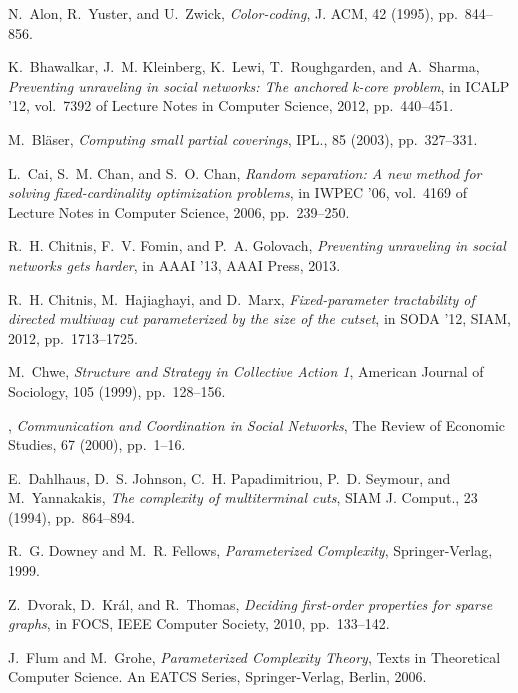 \documentclass[11pt,a4paper]{article}
\begin{document}
\begin{thebibliography}{10}

{\sc N.~Alon, R.~Yuster, and U.~Zwick}, {\em Color-coding}, J. ACM, 42 (1995),
  pp.~844--856.

{\sc K.~Bhawalkar, J.~M. Kleinberg, K.~Lewi, T.~Roughgarden, and A.~Sharma},
  {\em Preventing unraveling in social networks: The anchored k-core problem},
  in ICALP '12, vol.~7392 of Lecture Notes in Computer Science, 2012,
  pp.~440--451.

{\sc M.~Bl{\"a}ser}, {\em Computing small partial coverings}, IPL., 85 (2003),
  pp.~327--331.

{\sc L.~Cai, S.~M. Chan, and S.~O. Chan}, {\em Random separation: A new method
  for solving fixed-cardinality optimization problems}, in IWPEC '06, vol.~4169
  of Lecture Notes in Computer Science, 2006, pp.~239--250.

{\sc R.~H. Chitnis, F.~V. Fomin, and P.~A. Golovach}, {\em Preventing
  unraveling in social networks gets harder}, in AAAI '13, AAAI Press, 2013.

{\sc R.~H. Chitnis, M.~Hajiaghayi, and D.~Marx}, {\em Fixed-parameter
  tractability of directed multiway cut parameterized by the size of the
  cutset}, in SODA '12, SIAM, 2012, pp.~1713--1725.

{\sc M.~Chwe}, {\em {Structure and Strategy in Collective Action 1}}, American
  Journal of Sociology, 105 (1999), pp.~128--156.

\leavevmode\vrule height 2pt depth -1.6pt width 23pt, {\em {Communication and
  Coordination in Social Networks}}, The Review of Economic Studies, 67 (2000),
  pp.~1--16.

{\sc E.~Dahlhaus, D.~S. Johnson, C.~H. Papadimitriou, P.~D. Seymour, and
  M.~Yannakakis}, {\em The complexity of multiterminal cuts}, SIAM J. Comput.,
  23 (1994), pp.~864--894.

{\sc R.~G. Downey and M.~R. Fellows}, {\em Parameterized Complexity},
  Springer-Verlag, 1999.

{\sc Z.~Dvorak, D.~Kr{\'a}l, and R.~Thomas}, {\em Deciding first-order
  properties for sparse graphs}, in FOCS, IEEE Computer Society, 2010,
  pp.~133--142.

{\sc J.~Flum and M.~Grohe}, {\em Parameterized Complexity Theory}, Texts in
  Theoretical Computer Science. An EATCS Series, Springer-Verlag, Berlin, 2006.


\end{thebibliography}
\end{document}
